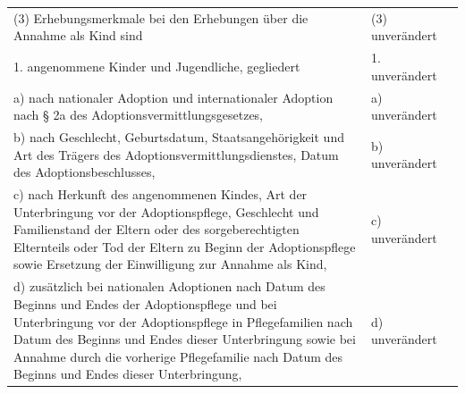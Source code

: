 \documentclass[10pt,a4paper,landscape]{article}
\begin{document}
\begin{longtable}{|L{8.2cm}|L{8.2cm}|L{8.2cm}|}
\hhline{|---|}
(3) Erhebungsmerkmale bei den  \newline Erhebungen über die Annahme als Kind  \newline sind & (3) unverändert &  \\
\hhline{|---|}
1.   \newline angenommene Kinder und Jugendliche,  \newline gegliedert & 1. unverändert &  \\
\hhline{|---|}
a)   \newline nach nationaler Adoption und  \newline internationaler Adoption nach \S{} 2a des  \newline Adoptionsvermittlungsgesetzes, & a) unverändert &  \\
\hhline{|---|}
b)   \newline nach Geschlecht, Geburtsdatum,  \newline Staatsangehörigkeit und Art des Trägers  \newline des Adoptionsvermittlungsdienstes, Datum  \newline des Adoptionsbeschlusses, & b) unverändert &  \\
\hhline{|---|}
c)   \newline nach Herkunft des angenommenen Kindes,  \newline Art der Unterbringung vor der  \newline Adoptionspflege, Geschlecht und  \newline Familienstand der Eltern oder des  \newline sorgeberechtigten Elternteils oder Tod der  \newline Eltern zu Beginn der Adoptionspflege  \newline sowie Ersetzung der Einwilligung zur  \newline Annahme als Kind, & c) unverändert &  \\
\hhline{|---|}
d)   \newline zusätzlich bei nationalen Adoptionen nach  \newline Datum des Beginns und Endes der  \newline Adoptionspflege und bei Unterbringung vor  \newline der Adoptionspflege in Pflegefamilien nach  \newline Datum des Beginns und Endes dieser  \newline Unterbringung sowie bei Annahme durch  \newline die vorherige Pflegefamilie nach Datum  \newline des Beginns und Endes dieser  \newline Unterbringung, & d) unverändert &  \\

\end{longtable}
\end{document}
